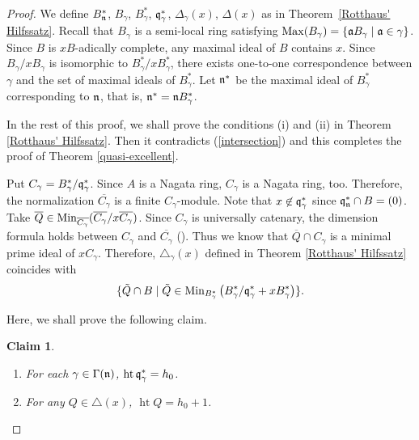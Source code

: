 \documentclass[11pt,a4paper]{amsart}
\newtheorem{claim}[theorem]{Claim}
\theoremstyle{definition}
\theoremstyle{remark}
\newcommand{\Ht}{\operatorname{ht}}
\newcommand{\fq}{\frak{q}}
\newcommand{\fa}{\frak{a}}
\newcommand{\fn}{\frak{n}}
\begin{document}
\begin{proof}
We define $B_\fn^*$, $B_\gamma$, $B_\gamma^*$, $\fq_\gamma^*$, $\Delta_\gamma(x)$, $\Delta(x)$ as in Theorem~\ref{Rotthaus' Hilfssatz}.
Recall that $B_\gamma$ is a semi-local ring satisfying 
${\rm Max}(B_\gamma) = \{ \fa B_\gamma \mid \fa \in \gamma \}$.
Since $B$ is $xB$-adically complete, any maximal ideal of $B$ contains $x$.
Since $B_\gamma/xB_\gamma$ is isomorphic to $B_\gamma^*/xB_\gamma^*$, 
there exists one-to-one correspondence between $\gamma$
and the set of maximal ideals of $B_\gamma^*$.
Let $\fn^*$ be the maximal ideal of $B_\gamma^*$
corresponding to $\fn$, that is, $\fn^* = \fn B_\gamma^*$.

\vspace{2mm}

In the rest of this proof, we shall prove the conditions (i) and (ii) in Theorem \ref{Rotthaus' Hilfssatz}. Then it contradicts (\ref{intersection}) and this completes the proof of Theorem \ref{quasi-excellent}.

\vspace{2mm}

Put $C_\gamma = B_\gamma^*/\fq_\gamma^*$.
Since $A$ is a Nagata ring, $C_\gamma$ is a Nagata ring, too.
Therefore, the normalization $\overline{C_\gamma}$ is a
finite $C_\gamma$-module.
Note that $x \not\in \fq_\gamma^*$ since $\fq_\fn^* \cap B = (0)$.
Take
$\overline{Q} \in 
{\rm Min}_{\overline{C_\gamma}}(\overline{C_\gamma}/x \overline{C_\gamma})$.
Since $C_\gamma$ is universally catenary,
the dimension formula holds between $C_\gamma$ and $\overline{C_\gamma}$
(\cite[Theorem 15.6]{Ma86}).
Thus we know that $\overline{Q} \cap C_\gamma$ is a minimal prime ideal of $xC_\gamma$.
Therefore, $\triangle_\gamma (x)$ defined in Theorem \ref{Rotthaus' Hilfssatz}
coincides with
\[%
\{ \tilde{Q} \cap B \mid \tilde{Q} \in {\rm Min}_{B_\gamma^*}\left( B_\gamma^*/
\fq_\gamma^* + xB_\gamma^* \right) \} .
\]%

Here, we shall prove the following claim.

\begin{claim}
\label{ht}
\begin{enumerate}
\item
For each $\gamma \in \Gamma(\fn)$, 
$\Ht \fq_\gamma^* = h_0$.
\item
For any $Q \in \triangle (x)$, $\Ht Q = h_0 + 1$.
\end{enumerate}
\end{claim}


\end{proof}
\end{document}
